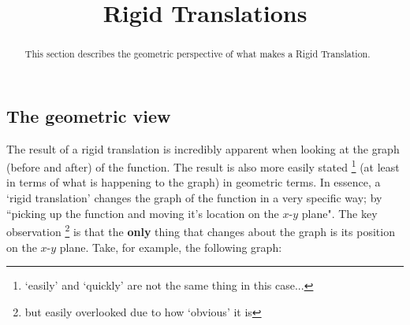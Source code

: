 \documentclass{ximeraXloud}
\title{Rigid Translations}
\begin{document}
\begin{abstract}
    This section describes the geometric perspective of what makes a Rigid Translation.
\end{abstract}
\maketitle

\subsection*{The geometric view}
    The result of a rigid translation is incredibly apparent when looking at the graph (before and after) of the function. The result is also more easily stated%
    \footnote{%
        `easily' and `quickly' are not the same thing in this case...%
        } 
    (at least in terms of what is happening to the graph) in geometric terms. In essence, a `rigid translation' changes the graph of the function in a very specific way; by ``picking up the function and moving it's location on the $x$-$y$ plane". The key observation%
    \footnote{%
        but easily overlooked due to how `obvious' it is%
        }
    is that the \textbf{only} thing that changes about the graph is its position on the $x$-$y$ plane. Take, for example, the following graph:
    
    \begin{minipage}{\textwidth}
        \begin{center}
        \end{center}
    \end{minipage}
    
\end{document}
